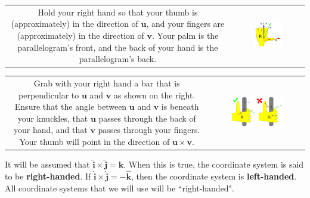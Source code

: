 \documentclass{article}
\begin{document}
\begin{tabular}{cc}
\parbox{0.5\textwidth}{
Hold your right hand so that your thumb is (approximately) in the direction of \(\mathbf{u}\), and your fingers are (approximately) in the direction of \(\mathbf{v}\). Your palm is the parallelogram's front, and the back of your hand is the parallelogram's back.  
} & \parbox{0.4\textwidth}{
\includegraphics[width = 0.4\textwidth]{right_hand_rule_1}
}
\end{tabular}

\begin{tabular}{cc}
\parbox{0.3\textwidth}{
Grab with your right hand a bar that is perpendicular to \(\mathbf{u}\) and \(\mathbf{v}\) as shown on the right. Ensure that the angle between \(\mathbf{u}\) and \(\mathbf{v}\) is beneath your knuckles, that \(\mathbf{u}\) passes through the back of your hand, and that \(\mathbf{v}\) passes through your fingers. Your thumb will point in the direction of \(\mathbf{u} \times \mathbf{v}\). 
} & \parbox{0.6\textwidth}{
\includegraphics[width = 0.6\textwidth]{right_hand_rule_2}
}
\end{tabular}

\vspace{5mm}

It will be assumed that \(\hat{\mathbf{i}} \times \hat{\mathbf{j}} = \hat{\mathbf{k}}\). When this is true, the coordinate system is said to be {\bf right-handed}. If \(\hat{\mathbf{i}} \times \hat{\mathbf{j}} = -\hat{\mathbf{k}}\), then the coordinate system is {\bf left-handed}. All coordinate systems that we will use will be ``right-handed".  
\end{document}
